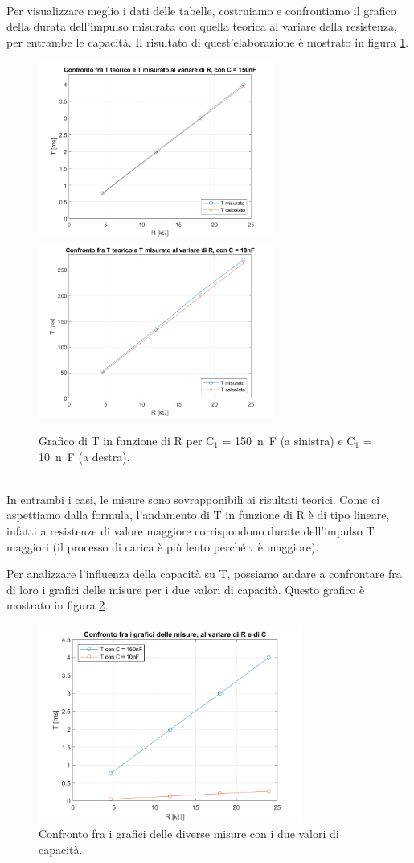 \documentclass{report}
\begin{document}
\\ Per visualizzare meglio i dati delle tabelle, costruiamo e confrontiamo il grafico della durata dell'impulso misurata con quella teorica al variare della resistenza, per entrambe le capacità. Il risultato di quest'elaborazione è mostrato in figura \ref{figura:graf1e2}.\begin{figure}[h!]
	\centering
	\includegraphics[height=5.8cm]{immagini/graficomis1}
	\includegraphics[height=5.8cm]{immagini/graficomis2}
	\caption{Grafico di T in funzione di R per $\mathrm{C_1}$ = \SI{150}{n\farad} (a sinistra) e $\mathrm{C_1}$ = \SI{10}{n\farad} (a destra).}
	\label{figura:graf1e2}
\end{figure}
\\ In entrambi i casi, le misure sono sovrapponibili ai risultati teorici. Come ci aspettiamo dalla formula, l'andamento di T in funzione di R è di tipo lineare, infatti a resistenze di valore maggiore corrispondono durate dell'impulso T maggiori (il processo di carica è più lento perché $\tau$ è maggiore). \par
Per analizzare l'influenza della capacità su T, possiamo andare a confrontare fra di loro i grafici delle misure per i due valori di capacità. Questo grafico è mostrato in figura \ref{figura:confrontoplot}.
\begin{figure}[h!]
	\centering
	\includegraphics[height=6.5cm]{immagini/graficoconfronto1}
	\caption{Confronto fra i grafici delle diverse misure con i due valori di capacità.}
	\label{figura:confrontoplot}
\end{figure}
\end{document}
